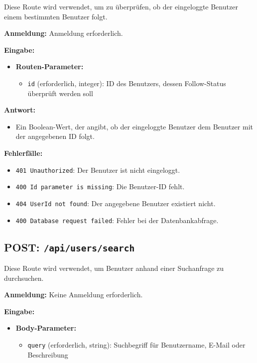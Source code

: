 \documentclass[a4paper,12pt]{article}
\begin{document}
Diese Route wird verwendet, um zu überprüfen, ob der eingeloggte Benutzer einem bestimmten Benutzer folgt.

\textbf{Anmeldung:} Anmeldung erforderlich.

\textbf{Eingabe:}
\begin{itemize}
    \item \textbf{Routen-Parameter:}
    \begin{itemize}
        \item \texttt{id} (erforderlich, integer):
            ID des Benutzers, dessen Follow-Status überprüft werden soll
    \end{itemize}
\end{itemize}

\textbf{Antwort:}
\begin{itemize}
    \item Ein Boolean-Wert, der angibt, ob der eingeloggte Benutzer dem
        Benutzer mit der angegebenen ID folgt.
\end{itemize}

\textbf{Fehlerfälle:}
\begin{itemize}
    \item \texttt{401 Unauthorized}:
        Der Benutzer ist nicht eingeloggt.
    \item \texttt{400 Id parameter is missing}:
        Die Benutzer-ID fehlt.
    \item \texttt{404 UserId not found}:
        Der angegebene Benutzer existiert nicht.
    \item \texttt{400 Database request failed}:
        Fehler bei der Datenbankabfrage.
\end{itemize}

\newpage
\subsection{POST: \texttt{/api/users/search}}

Diese Route wird verwendet, um Benutzer anhand einer Suchanfrage zu
durchsuchen.

\textbf{Anmeldung:} Keine Anmeldung erforderlich.

\textbf{Eingabe:}
\begin{itemize}
    \item \textbf{Body-Parameter:}
    \begin{itemize}
        \item \texttt{query} (erforderlich, string):
            Suchbegriff für Benutzername, E-Mail oder Beschreibung
    \end{itemize}
\end{itemize}
\end{document}
